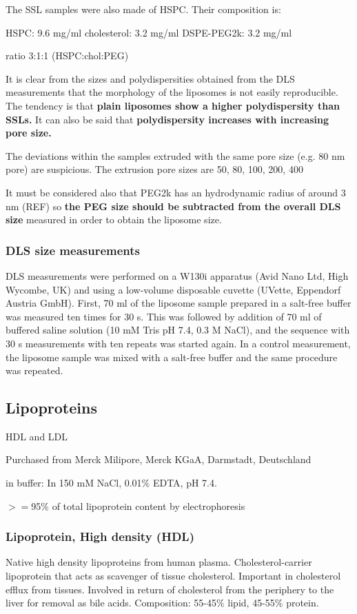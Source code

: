 The SSL samples were also made of HSPC. Their composition is:

HSPC: 9.6 mg/ml
cholesterol: 3.2 mg/ml
DSPE-PEG2k: 3.2 mg/ml

ratio 3:1:1 (HSPC:chol:PEG)

It is clear from the sizes and polydispersities obtained from the DLS measurements that the morphology of the liposomes is not easily reproducible. The tendency is that \textbf{plain liposomes show a higher polydispersity than SSLs.} It can also be said that \textbf{polydispersity increases with increasing pore size.} 

The deviations within the samples extruded with the same pore size (e.g. 80 nm pore) are suspicious. The extrusion pore sizes are 50, 80, 100, 200, 400

It must be considered also that PEG2k has an hydrodynamic radius of around 3 nm (REF) so \textbf{the PEG size should be subtracted from the overall DLS size} measured in order to obtain the liposome size.

\subsubsection{DLS size measurements}

DLS measurements were performed on a W130i apparatus (Avid Nano Ltd, High Wycombe, UK) and using a low-volume disposable cuvette (UVette, Eppendorf Austria GmbH). First, 70 ml of the liposome sample prepared in a salt-free buffer was measured ten times for 30 s. This was followed by addition of 70 ml of buffered saline solution (10 mM Tris pH 7.4, 0.3 M NaCl), and the sequence with 30 s measurements with ten repeats was started again. In a control measurement, the liposome sample was mixed with a salt-free buffer and the same procedure was repeated. 

\subsection{Lipoproteins}
HDL and LDL

Purchased from Merck Milipore, Merck KGaA, Darmstadt, Deutschland

in buffer: In 150 mM NaCl, 0.01$\%$ EDTA, pH 7.4. 

$>=$95$\%$ of total lipoprotein content by electrophoresis 

\subsubsection{Lipoprotein, High density (HDL)}
Native high density lipoproteins from human plasma. Cholesterol-carrier lipoprotein that acts as scavenger of tissue cholesterol. Important in cholesterol efflux from tissues. Involved in return of cholesterol from the periphery to the liver for removal as bile acids. Composition: 55-45$\%$ lipid, 45-55$\%$ protein.

